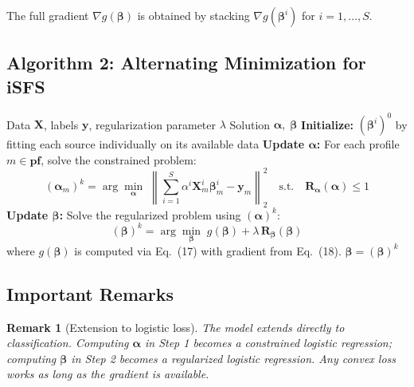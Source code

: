 \documentclass[11pt,a4paper]{article}
\newtheorem{remark}{Remark}
\begin{document}
The full gradient $\nabla g(\boldsymbol{\beta})$ is obtained by stacking $\nabla g(\boldsymbol{\beta}^i)$ for $i = 1, \ldots, S$.

\subsection{Algorithm 2: Alternating Minimization for iSFS}

\begin{algorithm}[H]
\caption{Alternating Minimization for solving iSFS (formulation (13))}
\begin{algorithmic}[1]
\REQUIRE Data $\mathbf{X}$, labels $\mathbf{y}$, regularization parameter $\lambda$
\ENSURE Solution $\boldsymbol{\alpha},\; \boldsymbol{\beta}$
\STATE \textbf{Initialize:} $(\boldsymbol{\beta}^i)^0$ by fitting each source individually on its available data
    \STATE \textbf{Update $\boldsymbol{\alpha}$:} For each profile $m \in \mathbf{pf}$, solve the constrained problem:
    \[
    (\boldsymbol{\alpha}_m)^k = \arg\min_{\boldsymbol{\alpha}}\;
    \left\|\sum_{i=1}^{S} \alpha^i \mathbf{X}_m^i \boldsymbol{\beta}_m^i - \mathbf{y}_m\right\|_2^2
    \quad\text{s.t.}\quad \mathbf{R}_{\boldsymbol{\alpha}}(\boldsymbol{\alpha}) \leq 1
    \]
    \STATE \textbf{Update $\boldsymbol{\beta}$:} Solve the regularized problem using $(\boldsymbol{\alpha})^k$:
    \[
    (\boldsymbol{\beta})^k = \arg\min_{\boldsymbol{\beta}}\; g(\boldsymbol{\beta}) + \lambda\,\mathbf{R}_{\boldsymbol{\beta}}(\boldsymbol{\beta})
    \]
    where $g(\boldsymbol{\beta})$ is computed via Eq.~(17) with gradient from Eq.~(18).
        \RETURN $\boldsymbol{\beta} = (\boldsymbol{\beta})^k$
    \ENDIF
\ENDFOR
\end{algorithmic}
\end{algorithm}

\subsection{Important Remarks}

\begin{remark}[Extension to logistic loss]
The model extends directly to classification. Computing $\boldsymbol{\alpha}$ in Step 1 becomes a constrained logistic regression; computing $\boldsymbol{\beta}$ in Step 2 becomes a regularized logistic regression. Any convex loss works as long as the gradient is available.
\end{remark}
\end{document}
